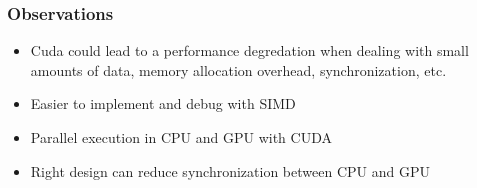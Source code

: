 \documentclass{beamer}
\begin{document}
\begin{frame}[plain]
	\begin{centering}
	\par
	\end{centering}
\end{frame}
\begin{frame}
	\frametitle{Observations}
	\begin{itemize}
	\item
	Cuda could lead to a performance degredation when dealing with small amounts of data, memory allocation overhead, synchronization, etc.
	\item
	Easier to implement and debug with SIMD
	\item
	Parallel execution in CPU and GPU with CUDA
	\item
	Right design can reduce synchronization between CPU and GPU
	\end{itemize}
\end{frame}
\end{document}
